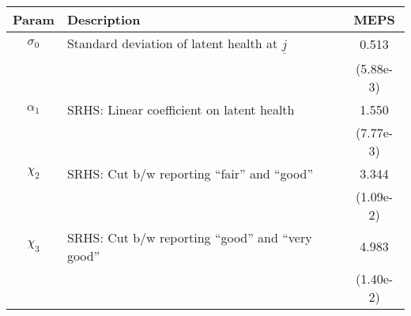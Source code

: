 \begin{table}[ht]\label{MEPSmenSRHSparams}
\footnotesize
\begin{center}
\begin{tabular}{clc}
\hline \hline
Param & Description & MEPS \\
\hline
$\sigma_{0}$ & Standard deviation of latent health at $\underline{j}$ & 0.513 \\
 & & (5.88e-3) \\
$\alpha_1$ & SRHS: Linear coefficient on latent health & 1.550 \\
 & & (7.77e-3) \\
$\chi_2$ & SRHS: Cut b/w reporting ``fair'' and ``good'' & 3.344 \\
 & & (1.09e-2) \\
$\chi_3$ & SRHS: Cut b/w reporting ``good'' and ``very good'' & 4.983 \\
 & & (1.40e-2) \\
\hline\hline
\end{tabular}
\end{center}
\end{table}
